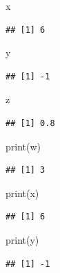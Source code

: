 \documentclass[
  12pt,
]{book}
\newenvironment{Shaded}{\begin{snugshade}}{\end{snugshade}}
\newcommand{\FunctionTok}[1]{\textcolor[rgb]{0.00,0.00,0.00}{#1}}
\newcommand{\NormalTok}[1]{#1}
\begin{document}
\begin{Shaded}
\begin{Highlighting}[]
\NormalTok{x}
\end{Highlighting}
\end{Shaded}

\begin{verbatim}
## [1] 6
\end{verbatim}

\begin{Shaded}
\begin{Highlighting}[]
\NormalTok{y}
\end{Highlighting}
\end{Shaded}

\begin{verbatim}
## [1] -1
\end{verbatim}

\begin{Shaded}
\begin{Highlighting}[]
\NormalTok{z}
\end{Highlighting}
\end{Shaded}

\begin{verbatim}
## [1] 0.8
\end{verbatim}

\begin{Shaded}
\begin{Highlighting}[]
\FunctionTok{print}\NormalTok{(w)}
\end{Highlighting}
\end{Shaded}

\begin{verbatim}
## [1] 3
\end{verbatim}

\begin{Shaded}
\begin{Highlighting}[]
\FunctionTok{print}\NormalTok{(x)}
\end{Highlighting}
\end{Shaded}

\begin{verbatim}
## [1] 6
\end{verbatim}

\begin{Shaded}
\begin{Highlighting}[]
\FunctionTok{print}\NormalTok{(y)}
\end{Highlighting}
\end{Shaded}

\begin{verbatim}
## [1] -1
\end{verbatim}
\end{document}
